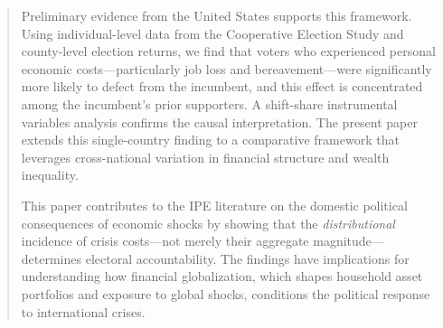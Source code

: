 \documentclass[12pt]{article}
\begin{document}
\begin{abstract}
Preliminary evidence from the United States supports this framework. Using individual-level data from the Cooperative Election Study and county-level election returns, we find that voters who experienced personal economic costs---particularly job loss and bereavement---were significantly more likely to defect from the incumbent, and this effect is concentrated among the incumbent's prior supporters. A shift-share instrumental variables analysis confirms the causal interpretation. The present paper extends this single-country finding to a comparative framework that leverages cross-national variation in financial structure and wealth inequality.

This paper contributes to the IPE literature on the domestic political consequences of economic shocks by showing that the \textit{distributional} incidence of crisis costs---not merely their aggregate magnitude---determines electoral accountability. The findings have implications for understanding how financial globalization, which shapes household asset portfolios and exposure to global shocks, conditions the political response to international crises.
\end{abstract}
\end{document}
